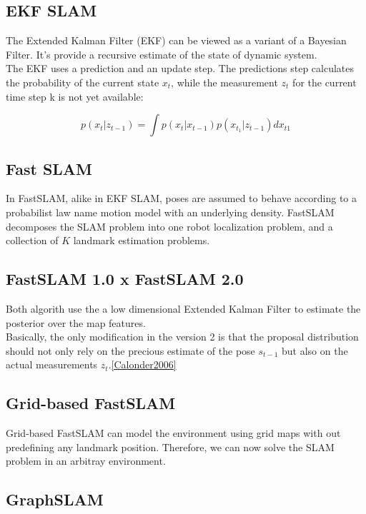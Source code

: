 \documentclass[10pt,journal,compsoc]{IEEEtran}
\begin{document}
\subsection{EKF SLAM}

The Extended Kalman Filter (EKF) can be viewed as a variant of a Bayesian Filter. It's provide a recursive estimate of
the state of dynamic system.\\
The EKF uses a prediction and an update step. The predictions step calculates the probability of the current state
$x_t$, while the measurement $z_t$ for the current time step k is not yet available:

\begin{equation}

  p(x_t|z_{t-1}) = \int p(x_t| x_{t-1}) p(x_{t_1}|z_{t-1}) dx_{t1}

\end{equation}

\subsection{Fast SLAM}

In FastSLAM, alike in EKF SLAM, poses are assumed to behave according to a probabilist law name motion model with an
underlying density. FastSLAM decomposes the SLAM problem into one robot localization problem, and a collection of $K$
landmark estimation problems.

\subsection{FastSLAM 1.0 x FastSLAM 2.0}

Both algorith use the a low dimensional Extended Kalman Filter to estimate the posterior over the map features.\\
Basically, the only modification in the version 2 is that the proposal distribution should not only rely on the precious
estimate of the pose $s_{t-1}$ but also on the actual measurements $z_t$.\ref{Calonder2006}

\subsection{Grid-based FastSLAM}
Grid-based FastSLAM can model the environment using grid maps with out predefining any landmark position. Therefore, we
can now solve the SLAM problem in an arbitray environment.

\subsection{GraphSLAM}
\end{document}
